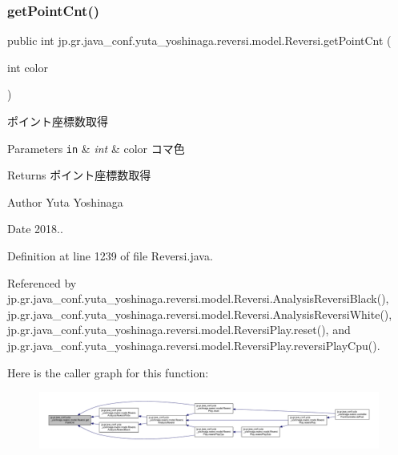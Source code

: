 \subsubsection{\texorpdfstring{get\+Point\+Cnt()}{getPointCnt()}}
{\footnotesize\ttfamily public int jp.\+gr.\+java\+\_\+conf.\+yuta\+\_\+yoshinaga.\+reversi.\+model.\+Reversi.\+get\+Point\+Cnt (\begin{DoxyParamCaption}\item[{int}]{color }\end{DoxyParamCaption})}



ポイント座標数取得 


\begin{DoxyParams}[1]{Parameters}
\mbox{\tt in}  & {\em int} & color コマ色 \\
\hline
\end{DoxyParams}
\begin{DoxyReturn}{Returns}
ポイント座標数取得 
\end{DoxyReturn}
\begin{DoxyAuthor}{Author}
Yuta Yoshinaga 
\end{DoxyAuthor}
\begin{DoxyDate}{Date}
2018.. 
\end{DoxyDate}


Definition at line 1239 of file Reversi.\+java.



Referenced by jp.\+gr.\+java\+\_\+conf.\+yuta\+\_\+yoshinaga.\+reversi.\+model.\+Reversi.\+Analysis\+Reversi\+Black(), jp.\+gr.\+java\+\_\+conf.\+yuta\+\_\+yoshinaga.\+reversi.\+model.\+Reversi.\+Analysis\+Reversi\+White(), jp.\+gr.\+java\+\_\+conf.\+yuta\+\_\+yoshinaga.\+reversi.\+model.\+Reversi\+Play.\+reset(), and jp.\+gr.\+java\+\_\+conf.\+yuta\+\_\+yoshinaga.\+reversi.\+model.\+Reversi\+Play.\+reversi\+Play\+Cpu().

Here is the caller graph for this function\+:
\nopagebreak
\begin{figure}[H]
\begin{center}
\leavevmode
\includegraphics[width=350pt]{classjp_1_1gr_1_1java__conf_1_1yuta__yoshinaga_1_1reversi_1_1model_1_1_reversi_a8ab289d67a725a30e92411c90b755bd8_icgraph}
\end{center}
\end{figure}
\mbox{\label{classjp_1_1gr_1_1java__conf_1_1yuta__yoshinaga_1_1reversi_1_1model_1_1_reversi_a9929ed36140ddc25923ede99f86564c3}} 
